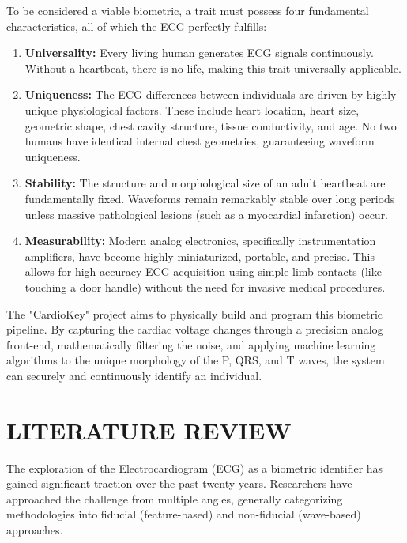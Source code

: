 \documentclass[12pt,a4paper]{report}
\begin{document}
To be considered a viable biometric, a trait must possess four fundamental characteristics, all of which the ECG perfectly fulfills: \\
\begin{enumerate}
\item \textbf{Universality:} Every living human generates ECG signals continuously. Without a heartbeat, there is no life, making this trait universally applicable.
\item \textbf{Uniqueness:} The ECG differences between individuals are driven by highly unique physiological factors. These include heart location, heart size, geometric shape, chest cavity structure, tissue conductivity, and age. No two humans have identical internal chest geometries, guaranteeing waveform uniqueness.
\item \textbf{Stability:} The structure and morphological size of an adult heartbeat are fundamentally fixed. Waveforms remain remarkably stable over long periods unless massive pathological lesions (such as a myocardial infarction) occur.
\item \textbf{Measurability:} Modern analog electronics, specifically instrumentation amplifiers, have become highly miniaturized, portable, and precise. This allows for high-accuracy ECG acquisition using simple limb contacts (like touching a door handle) without the need for invasive medical procedures. \\
\end{enumerate}

The "CardioKey" project aims to physically build and program this biometric pipeline. By capturing the cardiac voltage changes through a precision analog front-end, mathematically filtering the noise, and applying machine learning algorithms to the unique morphology of the P, QRS, and T waves, the system can securely and continuously identify an individual.


\chapter{LITERATURE REVIEW}
\vspace{10pt}
The exploration of the Electrocardiogram (ECG) as a biometric identifier has gained significant traction over the past twenty years. Researchers have approached the challenge from multiple angles, generally categorizing methodologies into fiducial (feature-based) and non-fiducial (wave-based) approaches. \\
\end{document}
